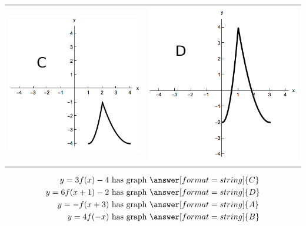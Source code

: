 \documentclass{ximera}
\begin{document}
\begin{exercise}
\begin{center}
\begin{tabular}{cc}
\includegraphics{transGraphC.png} & \includegraphics{transGraphD.png}
\end{tabular}
\end{center}
\begin{align*}
  y=3f(x)-4\text{ has graph }&\answer[format=string]{C}\\
 y=6f(x+1)-2\text{ has graph }&\answer[format=string]{D}\\
y=-f(x+3)\text{ has graph }&\answer[format=string]{A}\\
 y=4f(-x)\text{ has graph }&\answer[format=string]{B}
\end{align*}

\end{exercise}
\end{document}

